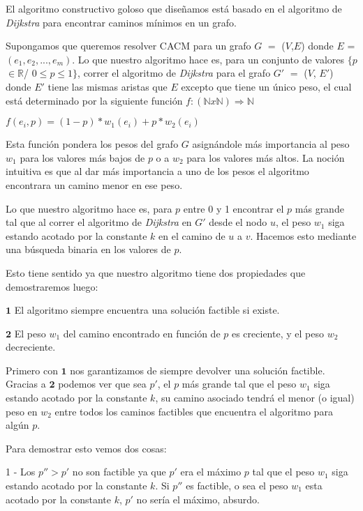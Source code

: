 El algoritmo constructivo goloso que diseñamos está basado en el algoritmo de \emph{Dijkstra} para encontrar caminos mínimos en un grafo. 

Supongamos que queremos resolver CACM para un grafo $G$ $=$ ($V$,$E$) donde $E$ = $(e_1, e_2, ..., e_m)$. Lo que nuestro algoritmo hace es, para un conjunto de valores $\{p$ $\in \mathbb{R}$/ $0 \leq p \leq 1\}$, correr el algoritmo de \emph{Dijkstra} para el grafo $G'$ $=$ ($V$, $E'$) donde $E'$ tiene las mismas aristas que $E$ excepto que tiene un único peso, el cual está determinado por la siguiente función $f: (\mathbb{N} x \mathbb{N}) \Rightarrow \mathbb{N}$

\begin{center}
$f(e_i,p) = (1-p)*w_1(e_i) + p*w_2(e_i)$
\end{center}

Esta función pondera los pesos del grafo $G$ asignándole más importancia al peso $w_1$ para los valores más bajos de $p$ o a $w_2$ para los valores más altos. La noción intuitiva es que al dar m\'as importancia a uno de los pesos el algoritmo encontrara un camino menor en ese peso.

Lo que nuestro algoritmo hace es, para $p$ entre 0 y 1 encontrar el $p$ más grande tal que al correr el algoritmo de \emph{Dijkstra} en $G'$ desde el nodo $u$, el peso $w_1$ siga estando acotado por la constante $k$ en el camino de $u$ a $v$. Hacemos esto mediante una búsqueda binaria en los valores de $p$.

Esto tiene sentido ya que nuestro algoritmo tiene dos propiedades que demostraremos luego:

$\mathbf{1}$ El algoritmo siempre encuentra una solución factible si existe.

$\mathbf{2}$ El peso $w_1$ del camino encontrado en función de $p$ es creciente, y el peso $w_2$ decreciente.

Primero con $\mathbf{1}$ nos garantizamos de siempre devolver una solución factible.
Gracias a $\mathbf{2}$ podemos ver que sea $p'$, el $p$ más grande tal que el peso $w_1$ siga estando acotado por la constante $k$, su camino asociado tendrá el menor (o igual) peso en $w_2$ entre todos los caminos factibles que encuentra el algoritmo para algún $p$.

Para demostrar esto vemos dos cosas:

1 - Los $p'' > p'$ no son factible ya que $p'$ era el m\'aximo $p$  tal que el peso $w_1$ siga estando acotado por la constante $k$. Si $p''$ es factible, o sea el peso $w_1$ esta acotado por la constante $k$, $p'$ no ser\'ia el m\'aximo, absurdo.

